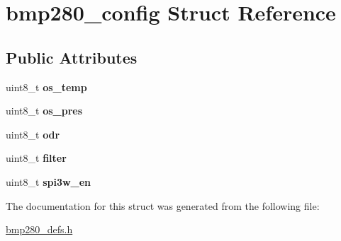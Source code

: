 \hypertarget{structbmp280__config}{}\section{bmp280\+\_\+config Struct Reference}
\label{structbmp280__config}
\subsection*{Public Attributes}
\begin{DoxyCompactItemize}
\item 
\mbox{\label{structbmp280__config_a2dce90a004a5feb1c71770a24acdc33e}} 
uint8\+\_\+t {\bfseries os\+\_\+temp}
\item 
\mbox{\label{structbmp280__config_a62d43cde776283413c3ed1b6b0b40d54}} 
uint8\+\_\+t {\bfseries os\+\_\+pres}
\item 
\mbox{\label{structbmp280__config_a7ffcc46b21ffc9ee6860cc77f405436c}} 
uint8\+\_\+t {\bfseries odr}
\item 
\mbox{\label{structbmp280__config_a18b9b6cdf0431e55e40d11a402313e07}} 
uint8\+\_\+t {\bfseries filter}
\item 
\mbox{\label{structbmp280__config_ac9a0540470596a6efcc06ff87bd435d5}} 
uint8\+\_\+t {\bfseries spi3w\+\_\+en}
\end{DoxyCompactItemize}


The documentation for this struct was generated from the following file\+:\begin{DoxyCompactItemize}
\item 
\mbox{\hyperlink{bmp280__defs_8h}{bmp280\+\_\+defs.\+h}}\end{DoxyCompactItemize}
